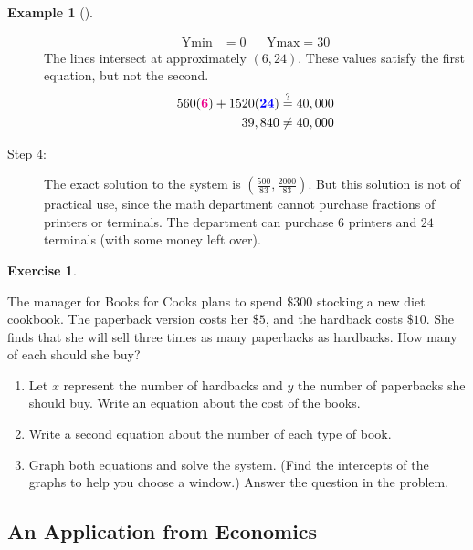 \documentclass[10pt,]{book}
\theoremstyle{plain}
\theoremstyle{definition}
\theoremstyle{definition}
\newtheorem{example}[theorem]{Example}
\theoremstyle{definition}
\theoremstyle{definition}
\newtheorem{exercise}[theorem]{Exercise}
\numberwithin{equation}{section}
\newcommand{\alert}[1]{\boldsymbol{\color{magenta}{#1}}}
\newcommand{\blert}[1]{\boldsymbol{\color{blue}{#1}}}
\newcommand{\amp}{ & }
\begin{document}
\begin{example}[]
\begin{description}
\begin{align*}
						\text{Ymin} \amp = 0 \amp\amp \text{Ymax} = 30
					
\end{align*}
				The lines intersect at approximately \((6, 24)\). These values satisfy the first equation, but not the second.
				\begin{align*}

						560(\alert{6})+1520(\blert{24})\amp\stackrel{?}{=}40,000 
					\\

						39,840 \amp\ne 40,000
					
\end{align*}
\item[Step 4:]{}
				The exact solution to the system is \(\left(\frac{500}{83},\frac{2000}{83}\right)\). But this solution is not of practical use, since the math department cannot purchase fractions of printers or terminals. The department can purchase \(6\) printers and \(24\) terminals (with some money left over).
\end{description}

\end{example}
\begin{exercise}\label{exercise-8}

		The manager for Books for Cooks plans to spend \(\$300\) stocking a new diet cookbook. The paperback version costs her \(\$5\), and the hardback costs \(\$10\). She finds that she will sell three times as many paperbacks as hardbacks. How many of each should she buy?
		\leavevmode%
\begin{enumerate}[label=*\alph**]
\item\hypertarget{li-47}{}
				Let \(x\) represent the number of hardbacks and \(y\) the number of paperbacks she should buy. Write an equation about the cost of the books.
\item\hypertarget{li-48}{}
				Write a second equation about the number of each type of book.
\item\hypertarget{li-49}{}
				Graph both equations and solve the system. (Find the intercepts of the graphs to help you choose a window.) Answer the question in the problem.
\end{enumerate}

\end{exercise}
\typeout{************************************************}
\typeout{************************************************}
\subsection[An Application from Economics]{An Application from Economics}\label{subsection-4}
\end{document}
